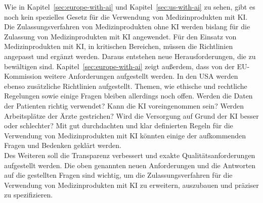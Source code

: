 Wie in Kapitel~\ref{sec:europe-with-ai} und Kapitel~\ref{sec:us-with-ai} zu sehen,
gibt es noch kein spezielles Gesetz für die Verwendung von Medizinprodukten mit KI.
Die Zulassungsverfahren von Medizinprodukten ohne KI werden bislang für die Zulassung von Medizinprodukten mit KI angewendet.
Für den Einsatz von Medizinprodukten mit KI, in kritischen Bereichen, müssen die Richtlinien angepasst und ergänzt werden.
Daraus entstehen neue Herausforderungen, die zu bewältigen sind.
Kapitel~\ref{sec:europe-with-ai} zeigt außerdem, dass von der EU-Kommission weitere Anforderungen aufgestellt werden.
In den USA werden ebenso zusätzliche Richtlinien aufgestellt.
Themen, wie ethische und rechtliche Regelungen sowie einige Fragen bleiben allerdings noch offen.
Werden die Daten der Patienten richtig verwendet? Kann die KI voreingenommen sein?
Werden Arbeitsplätze der Ärzte gestrichen? 
Wird die Versorgung auf Grund der KI besser oder schlechter? 
Mit gut durchdachten und klar definierten Regeln für die Verwendung von Medizinprodukten mit KI könnten einige
der aufkommenden Fragen und Bedenken geklärt werden.\\
Des Weiteren soll die Transparenz verbessert und exakte Qualitätsanforderungen aufgestellt werden.
Die oben genannten neuen Anforderungen und die Antworten auf die gestellten Fragen sind wichtig, 
um die Zulassungsverfahren für die Verwendung von Medizinprodukten mit KI zu erweitern,
auszubauen und präziser zu spezifizieren.